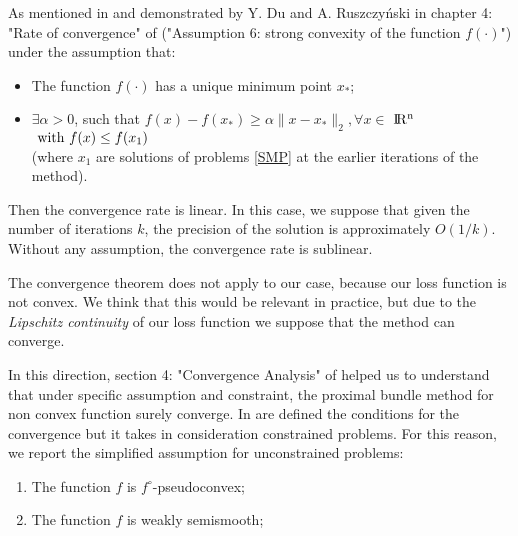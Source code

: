 As mentioned in \cite{PaperBM} and demonstrated by Y. Du and A. Ruszczyński in chapter 4: "Rate of convergence" of \cite{CBM} ("Assumption 6: strong convexity of the function $f(\cdot)$") under the assumption that:
\begin{itemize}
	\item The function $f(\cdot)$ has a unique minimum point $x_*$;
	\item $\exists \alpha>0$, such that $f(x)-f(x_*)\geq \alpha \parallel x-x_*\parallel_{2},\forall x \in$ $\rm I\!R^{n}$ $\textnormal{ with } f(x)\leq f(x_1)$ 
	\\ (where $x_1$ are solutions of problems \ref{SMP} at the earlier iterations of the method).
\end{itemize}
  Then the convergence rate is linear. In this case, we suppose that given the number of iterations $k$, the precision of the solution is approximately $O(1/k)$. Without any assumption, the convergence rate is sublinear. 

The convergence theorem does not apply to our case, because our loss function is not convex. We think that this would be relevant in practice, but due to the \textit{Lipschitz continuity} of our loss function we suppose that the method can converge. 

In this direction, section 4: "Convergence Analysis" of \cite{PBM} helped us to understand that under specific assumption and constraint, the proximal bundle method for non convex function surely converge. In \cite{PBM} are defined the conditions for the convergence but it takes in consideration constrained problems. For this reason, we report the simplified assumption for unconstrained problems:
\begin{enumerate} \label{convergence:PBM}
	\item The function $f$ is $f^{\circ}$-pseudoconvex;
	\item The function $f$ is weakly semismooth;
\end{enumerate}

